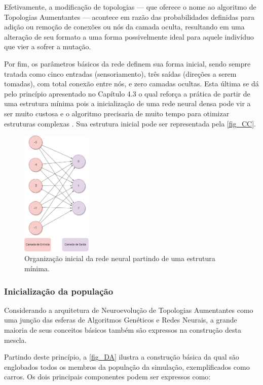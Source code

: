 Efetivamente, a modificação de topologias — que oferece o nome ao algoritmo de Topologias Aumentantes — acontece
em razão das probabilidades definidas para adição ou remoção de conexões ou nós da camada oculta,
resultando em uma alteração de seu formato a uma forma possivelmente ideal para aquele indivíduo que vier a sofrer a mutação.

Por fim, os parâmetros básicos da rede definem sua forma inicial, sendo sempre tratada como cinco entradas
(sensoriamento), três saídas (direções a serem tomadas), com total conexão entre nós, e zero camadas ocultas.
Esta última se dá pelo princípio apresentado no Capítulo 4.3 o qual reforça a prática de partir de uma
estrutura mínima pois a inicialização de uma rede neural densa pode vir a ser muito custosa e o algoritmo
precisaria de muito tempo para otimizar estruturas complexas \cite{stanley2004neat}. Sua estrutura inicial
pode ser representada pela \autoref{fig_CC}.

\begin{figure}[htb]
        \centering
        \caption{\label{fig_CC}Organização inicial da rede neural partindo de uma estrutura mínima.}
        \includegraphics[width=0.3\textwidth]{images/CC.png}
\end{figure}

\subsubsection{Inicialização da população}
Considerando a arquitetura de Neuroevolução de Topologias Aumentantes como uma junção das esferas de Algoritmos
Genéticos e Redes Neurais, a grande maioria de seus conceitos básicos também são expressos na construção desta mescla.

Partindo deste princípio, a \autoref{fig_DA} ilustra a construção básica da qual são englobados todos os membros
da população da simulação, exemplificados como carros. Os dois principais componentes podem ser expressos como:

